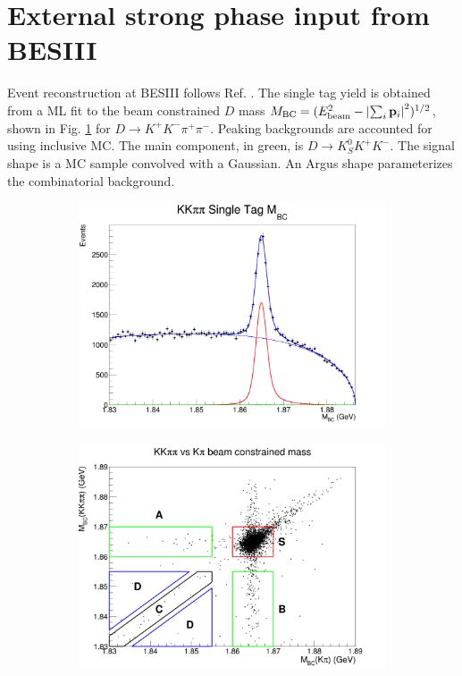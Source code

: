 \documentclass[12pt, a4paper, notitlepage, onecolumn]{article}
\begin{document}
\section{External strong phase input from BESIII}
\noindent Event reconstruction at BESIII follows Ref. \cite{cite_KSKKAnalysis}. The single tag yield is obtained from a ML fit to the beam constrained $D$ mass $M_\text{BC} = (E_\text{beam}^2 - \abs{\sum_i\vb{p}_i}^2)^{1/2}$, shown in Fig. \ref{fig_styield} for $D\to K^+K^-\pi^+\pi^-$. Peaking backgrounds are accounted for using inclusive MC. The main component, in green, is $D\to K_S^0K^+K^-$. The signal shape is a MC sample convolved with a Gaussian. An Argus shape parameterizes the combinatorial background.

\begin{figure}[H] 
  \centering
  \begin{subfigure}{0.5\textwidth}
    \centering
    \includegraphics[width=1\textwidth]{Plots/KKpipiSingleTagMBCPlot.png}
    \caption{}
    \label{fig_styield}
  \end{subfigure}%
  \begin{subfigure}{0.5\textwidth}
    \centering
    \includegraphics[width=1\textwidth]{Plots/KpiDoubleTagYield.png}

\end{subfigure}
\end{figure}
\end{document}
